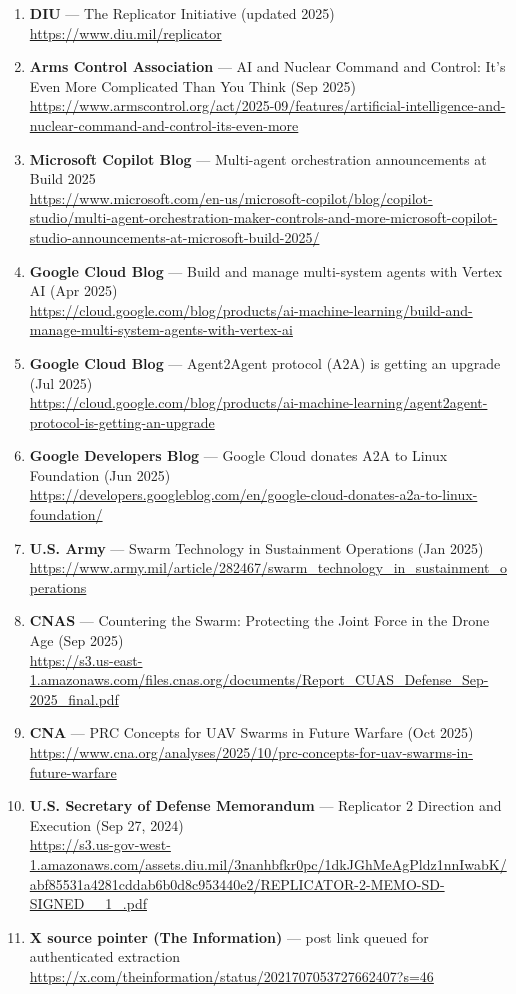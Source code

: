 \documentclass[11pt]{article}
\begin{document}
\begin{enumerate}
\item
  \textbf{DIU} --- The Replicator Initiative (updated 2025)\\
  \url{https://www.diu.mil/replicator}
\item
  \textbf{Arms Control Association} --- AI and Nuclear Command and
  Control: It's Even More Complicated Than You Think (Sep 2025)\\
  \url{https://www.armscontrol.org/act/2025-09/features/artificial-intelligence-and-nuclear-command-and-control-its-even-more}
\item
  \textbf{Microsoft Copilot Blog} --- Multi-agent orchestration
  announcements at Build 2025\\
  \url{https://www.microsoft.com/en-us/microsoft-copilot/blog/copilot-studio/multi-agent-orchestration-maker-controls-and-more-microsoft-copilot-studio-announcements-at-microsoft-build-2025/}
\item
  \textbf{Google Cloud Blog} --- Build and manage multi-system agents
  with Vertex AI (Apr 2025)\\
  \url{https://cloud.google.com/blog/products/ai-machine-learning/build-and-manage-multi-system-agents-with-vertex-ai}
\item
  \textbf{Google Cloud Blog} --- Agent2Agent protocol (A2A) is getting
  an upgrade (Jul 2025)\\
  \url{https://cloud.google.com/blog/products/ai-machine-learning/agent2agent-protocol-is-getting-an-upgrade}
\item
  \textbf{Google Developers Blog} --- Google Cloud donates A2A to Linux
  Foundation (Jun 2025)\\
  \url{https://developers.googleblog.com/en/google-cloud-donates-a2a-to-linux-foundation/}
\item
  \textbf{U.S. Army} --- Swarm Technology in Sustainment Operations (Jan
  2025)\\
  \url{https://www.army.mil/article/282467/swarm_technology_in_sustainment_operations}
\item
  \textbf{CNAS} --- Countering the Swarm: Protecting the Joint Force in
  the Drone Age (Sep 2025)\\
  \url{https://s3.us-east-1.amazonaws.com/files.cnas.org/documents/Report_CUAS_Defense_Sep-2025_final.pdf}
\item
  \textbf{CNA} --- PRC Concepts for UAV Swarms in Future Warfare (Oct
  2025)\\
  \url{https://www.cna.org/analyses/2025/10/prc-concepts-for-uav-swarms-in-future-warfare}
\item
  \textbf{U.S. Secretary of Defense Memorandum} --- Replicator 2
  Direction and Execution (Sep 27, 2024)\\
  \url{https://s3.us-gov-west-1.amazonaws.com/assets.diu.mil/3nanhbfkr0pc/1dkJGhMeAgPldz1nnIwabK/abf85531a4281cddab6b0d8c953440e2/REPLICATOR-2-MEMO-SD-SIGNED__1_.pdf}
\item
  \textbf{X source pointer (The Information)} --- post link queued for
  authenticated extraction\\
  \url{https://x.com/theinformation/status/2021707053727662407?s=46}
\end{enumerate}
\end{document}
